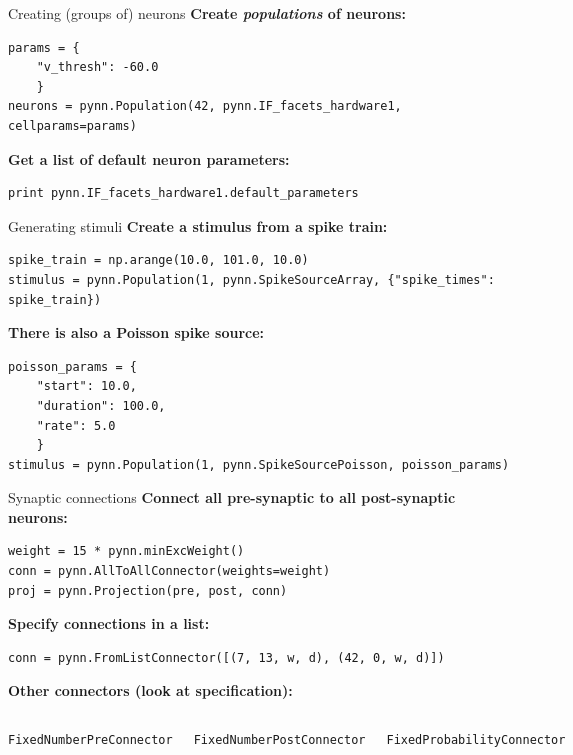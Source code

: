\documentclass[aspectratio=169]{beamer}
\begin{document}
\begin{frame}[fragile]{Creating (groups of) neurons}
	\textbf{Create \emph{populations} of neurons:}
	\begin{verbatim}
params = {
    "v_thresh": -60.0
    }
neurons = pynn.Population(42, pynn.IF_facets_hardware1, cellparams=params)
	\end{verbatim}

	\vspace{3ex}

	\textbf{Get a list of default neuron parameters:}
	\begin{verbatim}
print pynn.IF_facets_hardware1.default_parameters
	\end{verbatim}
\end{frame}

\begin{frame}[fragile]{Generating stimuli}
	\textbf{Create a stimulus from a spike train:}
	\begin{verbatim}
spike_train = np.arange(10.0, 101.0, 10.0)
stimulus = pynn.Population(1, pynn.SpikeSourceArray, {"spike_times": spike_train})
	\end{verbatim}

	\vspace{3ex}

	\textbf{There is also a Poisson spike source:}
	\begin{verbatim}
poisson_params = {
    "start": 10.0,
    "duration": 100.0,
    "rate": 5.0
    }
stimulus = pynn.Population(1, pynn.SpikeSourcePoisson, poisson_params)
	\end{verbatim}
\end{frame}

\begin{frame}[fragile]{Synaptic connections}
	\textbf{Connect all pre-synaptic to all post-synaptic neurons:}
	\begin{verbatim}
weight = 15 * pynn.minExcWeight()
conn = pynn.AllToAllConnector(weights=weight)
proj = pynn.Projection(pre, post, conn)
	\end{verbatim}

	\vspace{3ex}

	\textbf{Specify connections in a list:}
	\begin{verbatim}
conn = pynn.FromListConnector([(7, 13, w, d), (42, 0, w, d)])
	\end{verbatim}

	\vspace{3ex}

	\textbf{Other connectors (look at specification):}
	\begin{columns}[onlytextwidth]
		\texttt{FixedNumberPreConnector}

		\texttt{FixedNumberPostConnector}

		\texttt{FixedProbabilityConnector}
	\end{columns}
\end{frame}
\end{document}
